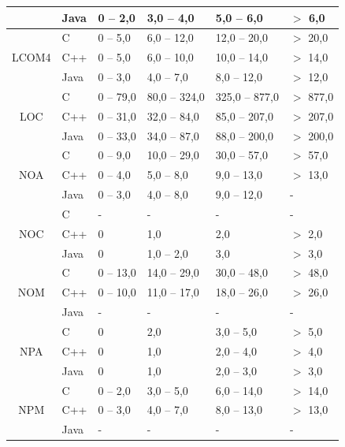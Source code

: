 \begin{table}[H]
\begin{tabular}{| c | l | l | l | l | l |}
                       & Java      & 0 -- 2,0   & 3,0 -- 4,0   & 5,0 -- 6,0   & $>$ 6,0   \\
    \hline
\multirow{3}{*}{LCOM4} & C         & 0 -- 5,0   & 6,0 -- 12,0  & 12,0 -- 20,0 & $>$ 20,0  \\
                       & C++       & 0 -- 5,0   & 6,0 -- 10,0  & 10,0 -- 14,0 & $>$ 14,0  \\
                       & Java      & 0 -- 3,0   & 4,0 -- 7,0   & 8,0 -- 12,0  & $>$ 12,0  \\
    \hline
\multirow{3}{*}{LOC}   & C       & 0 -- 79,0 & 80,0 -- 324,0 & 325,0 -- 877,0 & $>$ 877,0 \\
                       & C++      & 0 -- 31,0  & 32,0 -- 84,0 & 85,0 -- 207,0 & $>$ 207,0 \\
                       & Java     & 0 -- 33,0  & 34,0 -- 87,0 & 88,0 -- 200,0 & $>$ 200,0 \\
    \hline
\multirow{3}{*}{NOA}   & C         & 0 -- 9,0   & 10,0 -- 29,0 & 30,0 -- 57,0 & $>$ 57,0  \\
                       & C++       & 0 -- 4,0   & 5,0 -- 8,0   & 9,0 -- 13,0  & $>$ 13,0  \\
                       & Java      & 0 -- 3,0   & 4,0 -- 8,0   & 9,0 -- 12,0  & -         \\
    \hline
\multirow{3}{*}{NOC}   & C         & -          & -            & -            & -         \\
                       & C++       & 0          & 1,0          & 2,0          & $>$ 2,0   \\
                       & Java      & 0          & 1,0 -- 2,0   & 3,0          & $>$ 3,0   \\
    \hline
\multirow{3}{*}{NOM}   & C         & 0 -- 13,0  & 14,0 -- 29,0 & 30,0 -- 48,0 & $>$ 48,0  \\
                       & C++       & 0 -- 10,0  & 11,0 -- 17,0 & 18,0 -- 26,0 & $>$ 26,0  \\
                       & Java      & -          & -            & -            & -         \\
    \hline
\multirow{3}{*}{NPA}   & C         & 0          & 2,0          & 3,0 -- 5,0   & $>$ 5,0   \\
                       & C++       & 0          & 1,0          & 2,0 -- 4,0   & $>$ 4,0   \\
                       & Java      & 0          & 1,0          & 2,0 -- 3,0   & $>$ 3,0   \\
    \hline
\multirow{3}{*}{NPM}   & C         & 0 -- 2,0   & 3,0 -- 5,0   & 6,0 -- 14,0  & $>$ 14,0  \\
                       & C++       & 0 -- 3,0   & 4,0 -- 7,0   & 8,0 -- 13,0  & $>$ 13,0  \\
                       & Java      & -          & -            & -            & -         \\
    \hline


\end{tabular}
\end{table}
